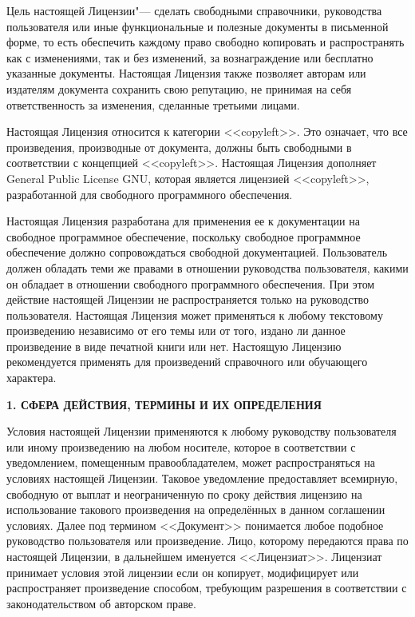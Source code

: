 Цель настоящей Лицензии"--- сделать свободными справочники, руководства
пользователя или иные функциональные и полезные документы в письменной
форме, то есть обеспечить каждому право свободно копировать и
распространять как с изменениями, так и без изменений, за вознаграждение
или бесплатно указанные документы. Настоящая Лицензия также позволяет
авторам или издателям документа сохранить свою репутацию, не принимая на
себя ответственность за изменения, сделанные третьими лицами.

Настоящая Лицензия относится к категории <<copyleft>>. Это означает, что
все произведения, производные от документа, должны быть свободными в
соответствии с концепцией <<copyleft>>. Настоящая Лицензия дополняет
General Public License GNU, которая является лицензией <<copyleft>>,
разработанной для свободного программного обеспечения.

Настоящая Лицензия разработана для применения ее к документации на
свободное программное обеспечение, поскольку свободное программное
обеспечение должно сопровождаться свободной документацией. Пользователь
должен обладать теми же правами в отношении руководства пользователя,
какими он обладает в отношении свободного программного обеспечения. При
этом действие настоящей Лицензии не распространяется только на
руководство пользователя. Настоящая Лицензия может применяться к любому
текстовому произведению независимо от его темы или от того, издано ли
данное произведение в виде печатной книги или нет. Настоящую Лицензию
рекомендуется применять для произведений справочного или обучающего
характера.


\begin{center}
{\Large\bf 1. СФЕРА ДЕЙСТВИЯ, ТЕРМИНЫ И ИХ ОПРЕДЕЛЕНИЯ\par}
\end{center}

Условия настоящей Лицензии применяются к любому руководству пользователя
или иному произведению на любом носителе, которое в соответствии с
уведомлением, помещенным правообладателем, может распространяться на
условиях настоящей Лицензии. Таковое уведомление предоставляет всемирную,
свободную от выплат и неограниченную по сроку действия лицензию на
использование такового произведения на определённых в данном соглашении
условиях. Далее под термином <<Документ>> понимается любое подобное
руководство пользователя или произведение. Лицо, которому передаются
права по настоящей Лицензии, в дальнейшем именуется <<Лицензиат>>.
Лицензиат принимает условия этой лицензии если он копирует, модифицирует
или распространяет произведение способом, требующим разрешения в
соответствии с законодательством об авторском праве.

